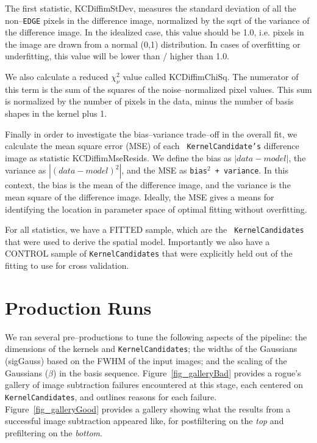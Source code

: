 \documentclass[prd, nofootinbib, floatfix, 11pt,tightenlines,times]{article}
\begin{document}
The first statistic, KCDiffimStDev, measures the standard deviation of
all the non--{\tt EDGE} pixels in the difference image, normalized by
the sqrt of the variance of the difference image.  In the idealized
case, this value should be 1.0, i.e. pixels in the image are drawn
from a normal (0,1) distribution.  In cases of overfitting or
underfitting, this value will be lower than / higher than 1.0.

We also calculate a reduced $\chi^2_\nu$ value called KCDiffimChiSq.
The numerator of this term is the sum of the squares of the
noise--normalized pixel values.  This sum is normalized by the number
of pixels in the data, minus the number of basis shapes in the kernel
plus 1.

Finally in order to investigate the bias--variance trade--off in the
overall fit, we calculate the mean square error (MSE) of each {\tt
  KernelCandidate's} difference image as statistic KCDiffimMseResids.
We define the bias as $\left| data - model \right|$, the variance as
$\left| (data - model)^2 \right|$, and the MSE as {\tt bias$^2$ +
  variance}.  In this context, the bias is the mean of the difference
image, and the variance is the mean square of the difference image.
Ideally, the MSE gives a means for identifying the location in
parameter space of optimal fitting without overfitting.

For all statistics, we have a FITTED sample, which are the {\tt
  KernelCandidates} that were used to derive the spatial model.
Importantly we also have a CONTROL sample of {\tt KernelCandidates}
that were explicitly held out of the fitting to use for cross
validation.

\section{Production Runs}

We ran several pre--productions to tune the following aspects of the
pipeline: the dimensions of the kernels and {\tt KernelCandidates};
the widths of the Gaussians (sigGauss) based on the FWHM of the input
images; and the scaling of the Gaussians ($\beta$) in the basis
sequence.  Figure~\ref{fig_galleryBad} provides a rogue's gallery of
image subtraction failures encountered at this stage, each centered on
{\tt KernelCandidates}, and outlines reasons for each failure.
Figure~\ref{fig_galleryGood} provides a gallery showing what the
results from a successful image subtraction appeared like, for
postfiltering on the {\it top} and prefiltering on the {\it bottom}.
\end{document}
